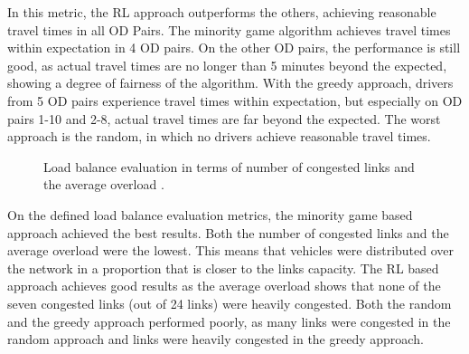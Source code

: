 \documentclass{RITA}
\begin{document}
In this metric, the RL approach outperforms the others, achieving reasonable travel times in all OD Pairs. The minority game algorithm achieves travel times within expectation in 4 OD pairs. On the other OD pairs, the performance is still good, as actual travel times are no longer than 5 minutes beyond the expected, showing a degree of fairness of the algorithm. With the greedy approach, drivers from 5 OD pairs experience travel times within expectation, but especially on OD pairs 1-10 and 2-8, actual travel times are far beyond the expected. The worst approach is the random, in which no drivers achieve reasonable travel times.


\begin{figure}[ht]
  \centering
  \caption{Load balance evaluation in terms of number of congested links  and the average overload .}
  \label{fig:loadBalance}
\end{figure}

On the defined load balance evaluation metrics, the minority game based approach achieved the best results. Both the number of congested links and the average overload were the lowest. This means that vehicles were distributed over the network in a proportion that is closer to the links capacity. The RL based approach achieves good results as the average overload shows that none of the seven congested links (out of 24 links) were heavily congested. Both the random and the greedy approach performed poorly, as many links were congested in the random approach and links were heavily congested in the greedy approach.
\end{document}
